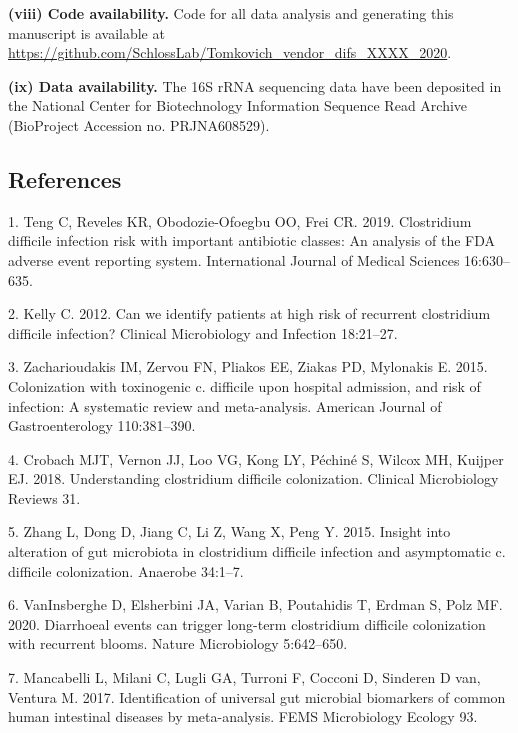 \documentclass[11pt,]{article}
\begin{document}
\textbf{(viii) Code availability.} Code for all data analysis and
generating this manuscript is available at
\url{https://github.com/SchlossLab/Tomkovich_vendor_difs_XXXX_2020}.

\textbf{(ix) Data availability.} The 16S rRNA sequencing data have been
deposited in the National Center for Biotechnology Information Sequence
Read Archive (BioProject Accession no. PRJNA608529).

\newpage

\subsection{References}\label{references}

\hypertarget{refs}{}
\hypertarget{ref-Teng2019}{}
1. Teng C, Reveles KR, Obodozie-Ofoegbu OO, Frei CR. 2019. Clostridium
difficile infection risk with important antibiotic classes: An analysis
of the FDA adverse event reporting system. International Journal of
Medical Sciences 16:630--635.

\hypertarget{ref-Kelly2012}{}
2. Kelly C. 2012. Can we identify patients at high risk of recurrent
clostridium difficile infection? Clinical Microbiology and Infection
18:21--27.

\hypertarget{ref-Zacharioudakis2015}{}
3. Zacharioudakis IM, Zervou FN, Pliakos EE, Ziakas PD, Mylonakis E.
2015. Colonization with toxinogenic c. difficile upon hospital
admission, and risk of infection: A systematic review and meta-analysis.
American Journal of Gastroenterology 110:381--390.

\hypertarget{ref-Crobach2018}{}
4. Crobach MJT, Vernon JJ, Loo VG, Kong LY, Péchiné S, Wilcox MH,
Kuijper EJ. 2018. Understanding clostridium difficile colonization.
Clinical Microbiology Reviews 31.

\hypertarget{ref-Zhang2015}{}
5. Zhang L, Dong D, Jiang C, Li Z, Wang X, Peng Y. 2015. Insight into
alteration of gut microbiota in clostridium difficile infection and
asymptomatic c. difficile colonization. Anaerobe 34:1--7.

\hypertarget{ref-VanInsberghe2020}{}
6. VanInsberghe D, Elsherbini JA, Varian B, Poutahidis T, Erdman S, Polz
MF. 2020. Diarrhoeal events can trigger long-term clostridium difficile
colonization with recurrent blooms. Nature Microbiology 5:642--650.

\hypertarget{ref-Mancabelli2017}{}
7. Mancabelli L, Milani C, Lugli GA, Turroni F, Cocconi D, Sinderen D
van, Ventura M. 2017. Identification of universal gut microbial
biomarkers of common human intestinal diseases by meta-analysis. FEMS
Microbiology Ecology 93.
\end{document}
